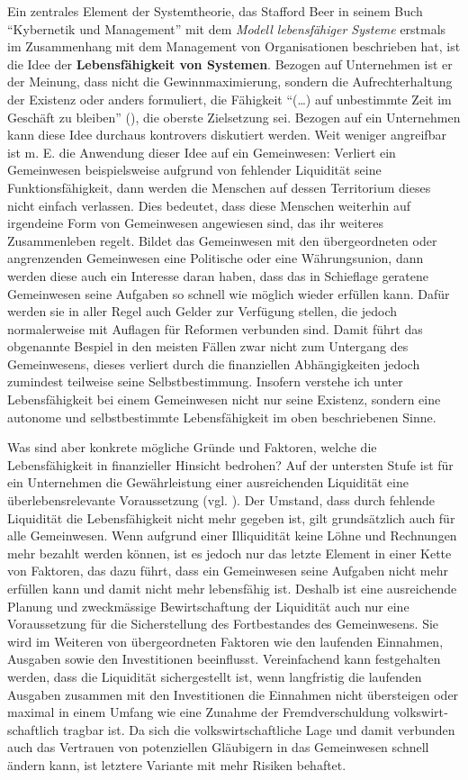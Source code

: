 \documentclass[10pt]{article}
\begin{document}
Ein zentrales Element der Systemtheorie, das Stafford Beer in seinem Buch “{}Kybernetik und Management”{} mit dem \textit{Modell lebensfähiger Systeme} erstmals im Zusammenhang mit dem Management von Organisationen beschrieben hat, ist die Idee der \textbf{Lebensfähigkeit von Systemen}. Bezogen auf Unternehmen ist er der Meinung, dass nicht die Gewinnmaximierung, sondern die Aufrechterhaltung der Existenz oder anders formuliert, die Fähigkeit “{}(…) auf unbestimmte Zeit im Geschäft zu bleiben”{} (\cite[S. 63]{Malik2008}), die oberste Zielsetzung sei. Bezogen auf ein Unternehmen kann diese Idee durchaus kontrovers diskutiert werden. Weit weniger angreifbar ist m. E. die Anwendung dieser Idee auf ein Gemeinwesen: Verliert ein Gemeinwesen beispielsweise aufgrund von fehlender Liquidität seine Funktionsfähigkeit, dann werden die Menschen auf dessen Territorium dieses nicht einfach verlassen. Dies bedeutet, dass diese Menschen weiterhin auf irgendeine Form von Gemeinwesen angewiesen sind, das ihr weiteres Zusammenleben regelt. Bildet das Gemeinwesen mit den übergeordneten oder angrenzenden Gemeinwesen eine Politische oder eine Währungsunion, dann werden diese auch ein Interesse daran haben, dass das in Schieflage geratene Gemeinwesen seine Aufgaben so schnell wie möglich wieder erfüllen kann. Dafür werden sie in aller Regel auch Gelder zur Verfügung stellen, die jedoch normalerweise mit Auflagen für Reformen verbunden sind. Damit führt das obgenannte Bespiel in den meisten Fällen zwar nicht zum Untergang des Gemeinwesens, dieses verliert durch die finanziellen Abhängigkeiten jedoch zumindest teilweise seine Selbstbestimmung. Insofern verstehe ich unter Lebensfähigkeit bei einem Gemeinwesen nicht nur seine Existenz, sondern eine autonome und selbstbestimmte Lebens­fähigkeit im oben beschriebenen Sinne.

Was sind aber konkrete mögliche Gründe und Faktoren, welche die Lebensfähigkeit in finanzieller Hinsicht bedrohen? Auf der untersten Stufe ist für ein Unternehmen die Gewährleistung einer ausreichenden Liquidität eine überlebensrelevante Voraussetzung (vgl. \cite[S. 43]{Malik2008}). Der Umstand, dass durch fehlende Liquidität die Lebensfähigkeit nicht mehr gegeben ist, gilt grundsätzlich auch für alle Gemeinwesen. Wenn aufgrund einer Illiquidität keine Löhne und Rechnungen mehr bezahlt werden können, ist es jedoch nur das letzte Element in einer Kette von Faktoren, das dazu führt, dass ein Gemeinwesen seine Aufgaben nicht mehr erfüllen kann und damit nicht mehr lebensfähig ist. Deshalb ist eine ausreichende Planung und zweckmässige Bewirtschaftung der Liquidität auch nur eine Voraussetzung für die Sicherstellung des Fortbestandes des Gemeinwesens. Sie wird im Weiteren von übergeordneten Faktoren wie den laufenden Einnahmen, Ausgaben sowie den Investitionen beeinflusst. Vereinfachend kann festgehalten werden, dass die Liquidität sichergestellt ist, wenn langfristig die laufenden Ausgaben zusammen mit den Investitionen die Einnahmen nicht übersteigen oder maximal in einem Umfang wie eine Zunahme der Fremdverschuldung volkswirt­schaftlich tragbar ist. Da sich die volkswirtschaftliche Lage und damit verbunden auch das Vertrauen von potenziellen Gläubigern in das Gemeinwesen schnell ändern kann, ist letztere Variante mit mehr Risiken behaftet.
\end{document}
